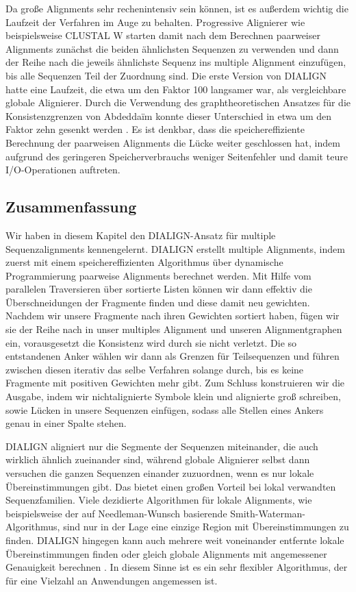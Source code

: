 Da große Alignments sehr rechenintensiv sein können, ist es außerdem wichtig die Laufzeit der Verfahren im Auge zu behalten. Progressive Alignierer wie beispielsweise CLUSTAL W starten damit nach dem Berechnen paarweiser Alignments zunächst die beiden ähnlichsten Sequenzen zu verwenden und dann der Reihe nach die jeweils ähnlichste Sequenz ins multiple Alignment einzufügen, bis alle Sequenzen Teil der Zuordnung sind.  Die erste Version von DIALIGN hatte eine Laufzeit, die etwa um den Faktor 100 langsamer war, als vergleichbare globale Alignierer. Durch die Verwendung des graphtheoretischen Ansatzes für die Konsistenzgrenzen von Abdedda\"im konnte dieser Unterschied in etwa um den Faktor zehn gesenkt werden \citep{am00}. Es ist denkbar, dass die speichereffiziente Berechnung der paarweisen Alignments die Lücke weiter geschlossen hat, indem aufgrund des geringeren Speicherverbrauchs weniger Seitenfehler und damit teure I/O-Operationen auftreten.


\subsection{Zusammenfassung}

Wir haben in diesem Kapitel den DIALIGN-Ansatz für multiple Sequenzalignments kennengelernt. DIALIGN erstellt multiple Alignments, indem zuerst mit einem speichereffizienten Algorithmus über dynamische Programmierung paarweise Alignments berechnet werden. Mit Hilfe vom parallelen Traversieren über sortierte Listen können wir dann effektiv die Überschneidungen der Fragmente finden und diese damit neu gewichten. Nachdem wir unsere Fragmente nach ihren Gewichten sortiert haben, fügen wir sie der Reihe nach in unser multiples Alignment und unseren Alignmentgraphen ein, vorausgesetzt die Konsistenz wird durch sie nicht verletzt. Die so entstandenen Anker wählen wir dann als Grenzen für Teilsequenzen und führen zwischen diesen iterativ das selbe Verfahren solange durch, bis es keine Fragmente mit positiven Gewichten mehr gibt. Zum Schluss konstruieren wir die Ausgabe, indem wir nichtalignierte Symbole klein und alignierte groß schreiben, sowie Lücken in unsere Sequenzen einfügen, sodass alle Stellen eines Ankers genau in einer Spalte stehen. 

DIALIGN aligniert nur die Segmente der Sequenzen miteinander, die auch wirklich ähnlich zueinander sind, während globale Alignierer selbst dann versuchen die ganzen Sequenzen einander zuzuordnen, wenn es nur lokale Übereinstimmungen gibt. Das bietet einen großen Vorteil bei lokal verwandten Sequenzfamilien. Viele dezidierte Algorithmen für lokale Alignments, wie beispielsweise der auf Needleman-Wunsch basierende Smith-Waterman-Algorithmus, sind nur in der Lage eine einzige Region mit Übereinstimmungen zu finden. DIALIGN hingegen kann auch mehrere weit voneinander entfernte lokale Übereinstimmungen finden oder gleich globale Alignments mit angemessener Genauigkeit berechnen \citep{mdw96}. In diesem Sinne ist es ein sehr flexibler Algorithmus, der für eine Vielzahl an Anwendungen angemessen ist. 

